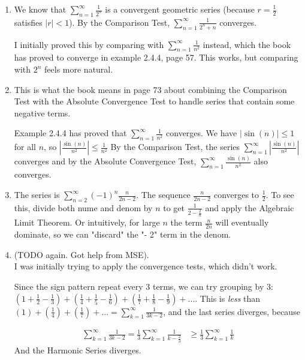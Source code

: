 \documentclass{oxmathproblems}
\begin{document}
\begin{questions}
\begin{solution}
  \begin{enumerate}[label=(\alph*)]
    \item We know that $\sum_{n=1}^{\infty}\frac{1}{2^n}$ is a convergent geometric series (because $r=\frac{1}{2}$ satisfies $|r| < 1$).
    By the Comparison Test, $\sum_{n=1}^{\infty}\frac{1}{2^{n} + n}$ converges.

    I initially proved this by comparing with $\sum_{n=1}^{\infty}\frac{1}{n^{2}}$ instead, which the book has proved to converge in example 2.4.4, page 57. This works,
    but comparing with $2^{n}$ feels more natural.

    \item This is what the book means in page 73 about combining the Comparison Test with the Absolute Convergence Test to handle series that contain some negative terms.
    
    Example 2.4.4 has proved that $\sum_{n=1}^{\infty}\frac{1}{n^{2}}$ converges. We have $|\sin(n)| \leq 1$ for all $n$, so $|\frac{\sin(n)}{n^{2}}| \leq \frac{1}{n^2}$
    By the Comparison Test, the series $\sum_{n=1}^{\infty}|\frac{\sin(n)}{n^{2}}|$ converges and by the Absolute Convergence Test,
    $\sum_{n=1}^{\infty}\frac{\sin(n)}{n^{2}}$ also converges.

    \item The series is $\sum_{n=2}^{\infty}(-1)^{n} \frac{n}{2n-2}$. The sequence $\frac{n}{2n-2}$ converges to $\frac{1}{2}$. To see this, divide both nume and denom by $n$
    to get $\frac{1}{2-\frac{2}{n}}$ and apply the Algebraic Limit Theorem. Or intuitively, for large $n$ the term $\frac{n}{2n}$ will eventually dominate,  so we can "discard"
    the "- 2" term in the denom.

    \item (TODO again. Got help from MSE). \\
    I was initially trying to apply the convergence tests, which didn't work.

    Since the sign pattern repeat every 3 terms, we can try grouping by 3: $(1 + \frac{1}{2} - \frac{1}{3}) + (\frac{1}{4} + \frac{1}{5} - \frac{1}{6}) + (\frac{1}{7} + \frac{1}{8} - \frac{1}{9}) + ...$.
    This is \textit{less} than $(1) + (\frac{1}{4}) + (\frac{1}{7}) + ... = \sum_{k=1}^{\infty}\frac{1}{3k-2}$, and the last series diverges, because

    \begin{align*}
      \sum_{k=1}^{\infty}\frac{1}{3k-2} = \frac{1}{3}\sum_{k=1}^{\infty}\frac{1}{k-\frac{2}{3}}
      &\geq \frac{1}{3}\sum_{k=1}^{\infty}\frac{1}{k}
    \end{align*}
    And the Harmonic Series diverges.


\end{enumerate}
\end{solution}
\end{questions}
\end{document}
